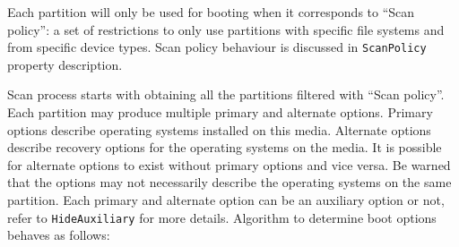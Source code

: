 \documentclass[]{article}
\begin{document}
Each partition will only be used for booting when it corresponds to ``Scan policy'': a set of restrictions
to only use partitions with specific file systems and from specific device types. Scan policy behaviour is
discussed in \texttt{ScanPolicy} property description.

Scan process starts with obtaining all the partitions filtered with ``Scan policy''. Each partition may
produce multiple primary and alternate options. Primary options describe operating systems installed
on this media. Alternate options describe recovery options for the operating systems on the media.
It is possible for alternate options to exist without primary options and vice versa. Be warned
that the options may not necessarily describe the operating systems on the same partition.
Each primary and alternate option can be an auxiliary option or not, refer to \texttt{HideAuxiliary}
for more details. Algorithm to determine boot options behaves as follows:
\end{document}
